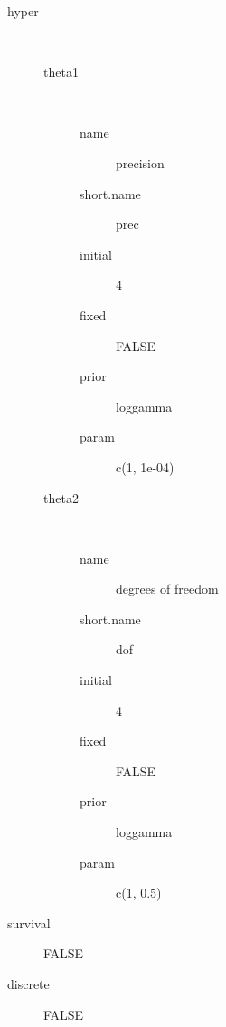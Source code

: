 \begin{description}
	\item[hyper]\ 
	 \begin{description}
	 	\item[theta1]\ 
	 	 \begin{description}
	 	 	 \item[ name ] precision 
	 	 	 \item[ short.name ] prec 
	 	 	 \item[ initial ] 4 
	 	 	 \item[ fixed ] FALSE 
	 	 	 \item[ prior ] loggamma 
	 	 	 \item[ param ] c(1, 1e-04) 
	 	 \end{description}
	 	\item[theta2]\ 
	 	 \begin{description}
	 	 	 \item[ name ] degrees of freedom 
	 	 	 \item[ short.name ] dof 
	 	 	 \item[ initial ] 4 
	 	 	 \item[ fixed ] FALSE 
	 	 	 \item[ prior ] loggamma 
	 	 	 \item[ param ] c(1, 0.5) 
	 	 \end{description}
	 \end{description}
	 \item[ survival ] FALSE 
	 \item[ discrete ] FALSE 
\end{description}
